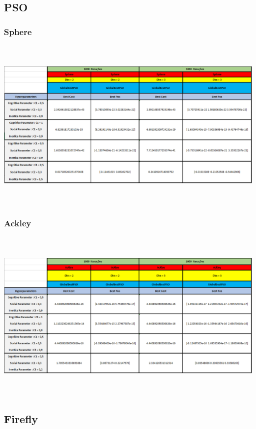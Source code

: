 \documentclass[10pt]{article}
\begin{document}
\subsection{PSO}\label{sec:comp-PSO}
\subsubsection{Sphere}\label{sec:comp-PSO:center}
    \includegraphics[height=8.5cm]{img/PSOsphere.png}

\subsubsection{Ackley}\label{sec:comp-PSO}
  \includegraphics[height=8.5cm]{img/PSOackley.png}

\subsection{Firefly}\label{sec:comp-PSO}
\end{document}
